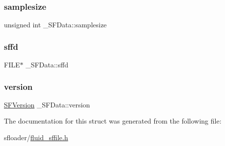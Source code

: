 \subsubsection{\texorpdfstring{samplesize}{samplesize}}
{\footnotesize\ttfamily unsigned int \+\_\+\+S\+F\+Data\+::samplesize}

\mbox{\label{struct__SFData_adf8fa1a6f5cc4d04cc262a2f79212c87}} 
\subsubsection{\texorpdfstring{sffd}{sffd}}
{\footnotesize\ttfamily F\+I\+LE$\ast$ \+\_\+\+S\+F\+Data\+::sffd}

\mbox{\label{struct__SFData_a9109780bbe02f384a94e9d24e0ec846f}} 
\subsubsection{\texorpdfstring{version}{version}}
{\footnotesize\ttfamily \hyperlink{fluid__sffile_8h_abd218ce0bb10f13c622c5b605abccbc9}{S\+F\+Version} \+\_\+\+S\+F\+Data\+::version}



The documentation for this struct was generated from the following file\+:\begin{DoxyCompactItemize}
\item 
sfloader/\hyperlink{fluid__sffile_8h}{fluid\+\_\+sffile.\+h}\end{DoxyCompactItemize}
